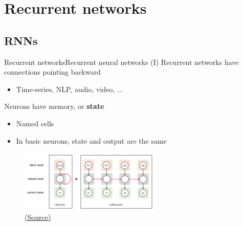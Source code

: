 \documentclass[10pt,compress]{beamer} %
\begin{document}
\section{Recurrent networks}
\subsection{RNNs}
\begin{frame}{Recurrent networks}{Recurrent neural networks (I)}
	Recurrent networks have connections pointing backward
    \begin{itemize}
        \item Time-series, NLP, audio, video, ...
    \end{itemize}
    Neurons have memory, or \textbf{state}
    \begin{itemize}
        \item Named \alert{cells}
        \item In basic neurons, state and output are the same
    \end{itemize}

	\begin{figure}
        \includegraphics[width=0.6\textwidth]{figs/recurrent.png}\\
	    \scriptsize\href{https://www.bouvet.no/bouvet-deler/explaining-recurrent-neural-networks}{(Source)}
	\end{figure}
\end{frame}
\end{document}
